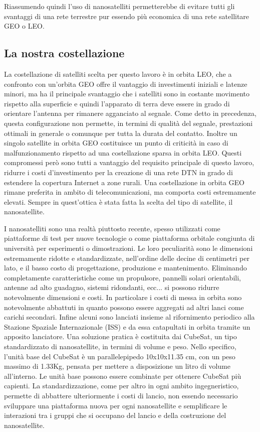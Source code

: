 \documentclass[12pt,a4paper,oneside]{book}
\begin{document}
		Riassumendo quindi l'uso di nanosatelliti permetterebbe di evitare tutti gli svantaggi di una rete terrestre pur essendo più economica di una rete satellitare GEO o LEO. 
		
		\subsection{La nostra costellazione}
		La costellazione di satelliti scelta per questo lavoro è in orbita LEO, che a confronto con un'orbita GEO offre il vantaggio di investimenti iniziali e latenze minori, ma ha il principale svantaggio che i satelliti sono in costante movimento rispetto alla superficie e quindi l'apparato di terra deve essere in grado di orientare l'antenna per rimanere agganciato al segnale. Come detto in precedenza, questa configurazione non permette, in termini di qualità del segnale, prestazioni ottimali in generale o comunque per tutta la durata del contatto. Inoltre un singolo satellite in orbita GEO costituisce un punto di criticità in caso di malfunzionamento rispetto ad una costellazione sparsa in orbita LEO. Questi compromessi però sono tutti a vantaggio del requisito principale di questo lavoro, ridurre i costi d'investimento per la creazione di una rete DTN in grado di estendere la copertura Internet a zone rurali. Una costellazione in orbita GEO rimane preferita in ambito di telecomunicazioni, ma comporta costi estremamente elevati. Sempre in quest'ottica è stata fatta la scelta del tipo di satellite, il nanosatellite.
		
		I nanosatelliti sono una realtà piuttosto recente, spesso utilizzati come piattaforme di test per nuove tecnologie o come piattaforma orbitale congiunta di università per esperimenti o dimostrazioni. Le loro peculiarità sono le dimensioni estremamente ridotte e standardizzate, nell'ordine delle decine di centimetri per lato, e il basso costo di progettazione, produzione e mantenimento. Eliminando completamente caratteristiche come un propulsore, pannelli solari orientabili, antenne ad alto guadagno, sistemi ridondanti, ecc... si possono ridurre notevolmente dimensioni e costi. In particolare i costi di messa in orbita sono notevolmente abbattuti in quanto possono essere aggregati ad altri lanci come carichi secondari. Infine alcuni sono lanciati insieme al rifornimento periodico alla Stazione Spaziale Internazionale (ISS) e da essa catapultati in orbita tramite un apposito lanciatore. 
		Una soluzione pratica è costituita dai CubeSat, un tipo standardizzato di nanosatellite, in termini di volume e peso. Nello specifico, l'unità base del CubeSat è un parallelepipedo 10x10x11.35 cm, con un peso massimo di 1.33Kg, pensata per mettere a disposizione un litro di volume all'interno. Le unità base possono essere combinate per ottenere CubeSat più capienti. La standardizzazione, come per altro in ogni ambito ingegneristico, permette di abbattere ulteriormente i costi di lancio, non essendo necessario sviluppare una piattaforma nuova per ogni nanosatellite e semplificare le interazioni tra i gruppi che si occupano del lancio e della costruzione del nanosatellite.
		
\end{document}
